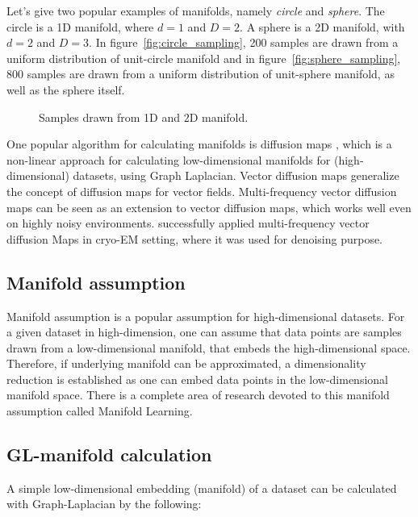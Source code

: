 Let's give two popular examples of manifolds, namely \textit{circle} and \textit{sphere}.
The circle is a 1D manifold, where $d=1$ and $D=2$. A sphere is a 2D manifold, with $d=2$ and $D=3$.
In figure~\ref{fig:circle_sampling}, 200 samples are drawn from a uniform distribution of unit-circle manifold
and in figure~\ref{fig:sphere_sampling}, 800 samples are drawn from a uniform distribution of unit-sphere manifold,
as well as the sphere itself.

\begin{figure}[H]
    \centering
    \caption{Samples drawn from 1D and 2D manifold.}
\end{figure}

One popular algorithm for calculating manifolds is diffusion maps \cite{diffusionMaps}, 
which is a non-linear approach for calculating low-dimensional manifolds
for (high-dimensional) datasets, using Graph Laplacian.
Vector diffusion maps \cite{vectorDiffusionMaps} generalize the concept of diffusion maps for vector fields.
Multi-frequency vector diffusion maps \cite{multiDiffusionMaps} 
can be seen as an extension to vector diffusion maps, which works well even on highly noisy environments.
\citet{cryoEmMutliDM} successfully applied multi-frequency vector diffusion Maps in cryo-EM setting,
 where it was used for denoising purpose.

\subsection{Manifold assumption}
\label{sec:manifoldAssumption}
Manifold assumption is a popular assumption for high-dimensional datasets.
For a given dataset in high-dimension, one can assume that data points are samples drawn from a low-dimensional manifold,
that embeds the high-dimensional space. 
Therefore, if underlying manifold can be approximated, a dimensionality reduction
is established as one can embed data points in the low-dimensional manifold space.
There is a complete area of research devoted to this manifold assumption called Manifold Learning\cite{ManifoldLearning}.

\subsection{GL-manifold calculation}
\label{sec:manifold_calculation}
A simple low-dimensional embedding (manifold) of a dataset can be calculated with Graph-Laplacian 
by the following:

